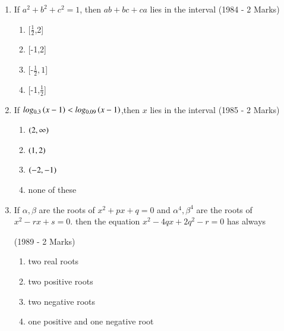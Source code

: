 \documentclass[journal,12pt,twocolumn]{IEEEtran}
\theoremstyle{remark}
\begin{document}
\begin{enumerate}
\hfill (1984 - 2 marks)
\begin{enumerate}
\item no root
\item one root
\item two equal roots
\item infinitely many roots 
\end{enumerate}
\item If $a^2+b^2+c^2=1$, then $ab+bc+ca$ lies in the interval \hfill (1984 - 2 Marks)
\begin{enumerate}
\item {[$\frac{1}{2}$,2]}
\item {[-1,2]}
\item {[-$\frac{1}{2},1$]}
\item {[-1,$\frac{1}{2}$]}
\end{enumerate}
\item If $log_{0.3}\left(x-1\right)<log_{0.09}\left(x-1\right)$,then $x$ lies in the interval 
\hfill (1985 - 2 Marks)
\begin{enumerate}
\item $\left(2,\infty\right)$
\item $\left(1,2\right)$
\item $\left(-2,-1\right)$
\item none of these
\end{enumerate}
\item If $\alpha,\beta$ are the roots of $x^2+px+q=0$ and $\alpha^4,\beta^4$ are the roots of $x^2-rx+s=0$. then the equation $x^2-4qx+2q^2-r=0$ has always
 
\hfill(1989 - 2 Marks)
\begin{enumerate}
\item two real roots
\item two positive roots
\item two negative roots
\item one positive and one negative root
\end{enumerate}
\end{enumerate}
\end{document}
